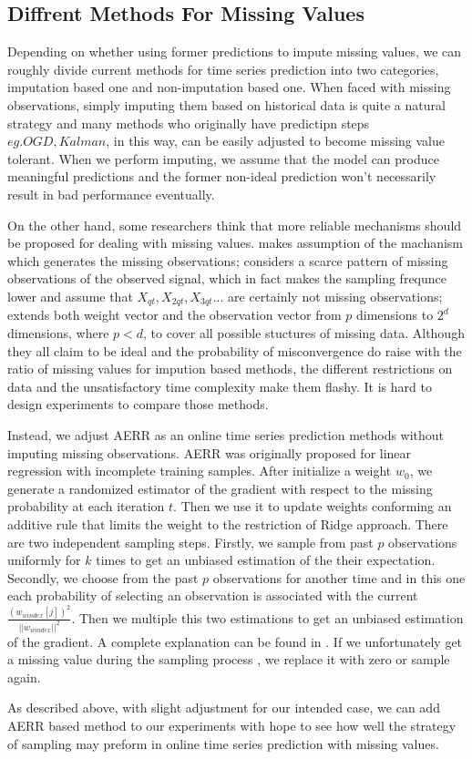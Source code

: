 \subsection{Diffrent Methods For Missing Values}
Depending on whether using former predictions to impute missing values, we can roughly divide current methods for time series prediction into two categories, imputation based one and non-imputation based one. When faced with missing observations, simply imputing them based on historical data is quite a natural strategy and many methods who originally have predictipn steps\(eg. OGD, Kalman\), in this way, can be easily adjusted to become missing value tolerant. When we perform imputing, we assume that the model can produce meaningful predictions and the former non-ideal prediction won't necessarily result in bad performance eventually.

On the other hand, some researchers think that more reliable mechanisms should be proposed for dealing with missing values. \cite{W1981Estimation} makes assumption of the machanism which generates the missing observations; \cite{Ding2010Time} considers a scarce pattern of missing observations of the observed signal, which in fact makes the sampling frequnce lower and assume that $X_{qt}, X_{2qt}, X_{3qt}...$ are certainly not missing observations; \cite{Anava2015Online} extends both weight vector and the observation vector from $p$ dimensions to $2^d$ dimensions, where $p<d$, to cover all possible stuctures of missing data. Although they all claim to be ideal and the probability of misconvergence do raise with the ratio of missing values for impution based methods, the different restrictions on data and the unsatisfactory time complexity make them flashy. It is hard to design experiments to compare those methods.

Instead, we adjust AERR \cite{Hazan2012Linear} as an online time series prediction methods without imputing missing observations. AERR was originally proposed for linear regression with incomplete training samples. After initialize a weight \boldmath $w_0$, we generate a randomized estimator of the gradient with respect to the missing probability at each iteration $t$. Then we use it to update weights conforming an additive rule that limits the weight to the restriction of Ridge approach. There are two independent sampling steps. Firstly, we sample from past $p$ observations uniformly for $k$ times to get an unbiased estimation of the their expectation. Secondly, we choose from the past $p$ observations for another time and in this one each probability of selecting an observation is associated with the current \boldmath $\frac{(w_{windex}[j])^2}{||w_{windex}||^2}$. Then we multiple this two estimations to get an unbiased estimation of the gradient. A complete explanation can be found in \cite{Hazan2012Linear}. If we unfortunately get a missing value during the sampling process , we replace it with zero or sample again. 

As described above, with slight adjustment for our intended case, we can add AERR based method to our experiments with hope to see how well the strategy of sampling may preform in online time series prediction with missing values.
